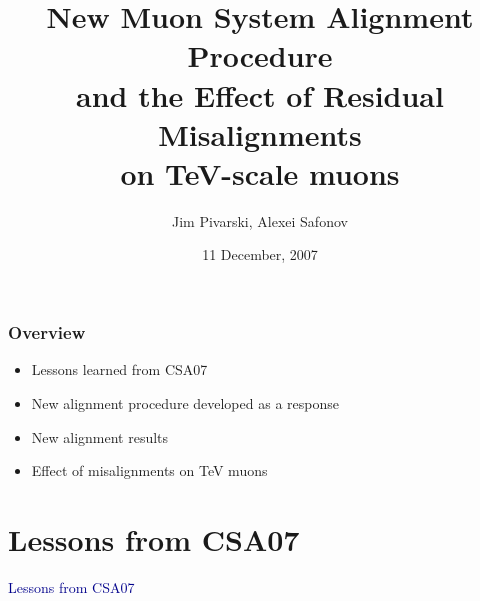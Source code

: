\documentclass[compress]{beamer}
\title{New Muon System Alignment Procedure \\ and the Effect of Residual Misalignments \\ on TeV-scale muons}
\author{Jim Pivarski, Alexei Safonov}
\institute{Texas A\&M University}
\date{11 December, 2007}
\begin{document}
\frame{\titlepage}



\begin{frame}
\frametitle{Overview}
\begin{itemize}\setlength{\itemsep}{0.75 cm}
\item Lessons learned from CSA07
\item New alignment procedure developed as a response
\item New alignment results
\item Effect of misalignments on TeV muons
\end{itemize}
\end{frame}

\section*{Lessons from CSA07}

\begin{frame}
\begin{center}
\Huge \textcolor{darkblue}{Lessons from CSA07}
\end{center}
\end{frame}
\end{document}
